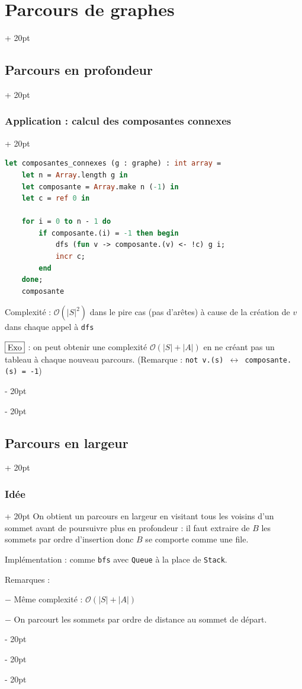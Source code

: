 \documentclass[a4paper, 12pt, twoside]{article}
\newcommand{\lr}[1]{\left( #1 \right)}
\newcommand{\abs}[1]{\left\lvert #1 \right\rvert}
\newcommand{\ind}[1][20pt]{\advance\leftskip + #1}
\newcommand{\deind}[1][20pt]{\advance\leftskip - #1}
\newenvironment{indt}[2][20pt]{#2 \par \ind[#1]}{\par \deind} %
\begin{document}
\begin{indt}{\section{Parcours de graphes}}
\begin{indt}{\subsection{Parcours en profondeur}}
\begin{indt}{\subsubsection{Application : calcul des composantes connexes}}
                \begin{lstlisting}[language=Caml, xleftmargin=80pt]
let composantes_connexes (g : graphe) : int array =
    let n = Array.length g in
    let composante = Array.make n (-1) in
    let c = ref 0 in

    for i = 0 to n - 1 do
        if composante.(i) = -1 then begin
            dfs (fun v -> composante.(v) <- !c) g i;
            incr c;
        end
    done;
    composante
                \end{lstlisting}

                Complexité : $\mathcal O\!\lr{\abs S ^2}$ dans le pire cas (pas d'arêtes) à cause de la création de $v$ dans chaque appel à \texttt{dfs}

                $\boxed{\rm Exo}$ : on peut obtenir une complexité $\mathcal O(\abs S + \abs A)$ en ne créant pas un tableau à chaque nouveau parcours. (Remarque : \texttt{not v.(s) $\leftrightarrow$ composante.(s) = -1})
            \end{indt}
        \end{indt}

        \vspace{12pt}
        
        \begin{indt}{\subsection{Parcours en largeur}}
            \begin{indt}{\subsubsection{Idée}}
                On obtient un parcours en largeur en visitant tous les voisins d'un sommet avant de poursuivre plus en profondeur : il faut extraire de $B$ les sommets par ordre d'insertion donc $B$ se comporte comme une file.

                Implémentation : comme \texttt{bfs} avec \texttt{Queue} à la place de \texttt{Stack}.

                Remarques :

                $-$ Même complexité : $\mathcal O\!\lr{\abs S + \abs A}$

                $-$ On parcourt les sommets par ordre de distance au sommet de départ.
            \end{indt}

            \vspace{12pt}
            

\end{indt}
\end{indt}
\end{document}
